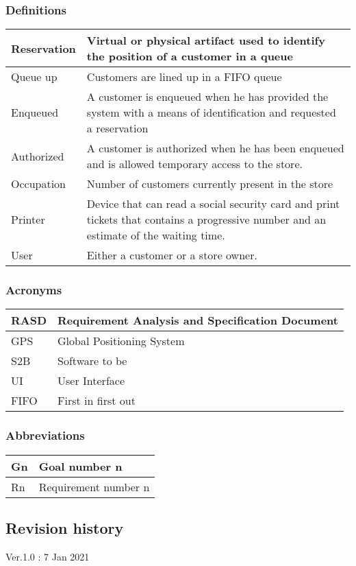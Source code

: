 \subsubsection{Definitions}
\begin{tabular}{ | m{5cm} | m{10cm} | }
	\hline
	Reservation & Virtual or physical artifact used to identify the position of a customer in a queue \\
	\hline
	Queue up & Customers are lined up in a FIFO queue\\
	\hline
	Enqueued & A customer is enqueued when he has provided the system with a means of identification and requested a reservation\\
	\hline
	Authorized & A customer is authorized when he has been enqueued and is allowed temporary access to the store.\\
	\hline
	Occupation & Number of customers currently present in the store\\
	\hline
	Printer & Device that can read a social security card and print tickets that contains a progressive number and an estimate of the waiting time.\\
	\hline
	User & Either a customer or a store owner.\\
	\hline
\end{tabular}
\subsubsection{Acronyms}
\begin{tabular}{ | m{5cm} | m{10cm} | }
	\hline
	RASD & Requirement Analysis and Specification Document \\
	\hline
	GPS & Global Positioning System \\
	\hline
	S2B & Software to be \\
	\hline
	UI & User Interface\\
	\hline
	FIFO & First in first out\\
	\hline
\end{tabular}
\subsubsection{Abbreviations}
\begin{tabular}{ | m{5cm} | m{10cm} | }
	\hline
	Gn & Goal number n \\
	\hline
	Rn & Requirement number n \\
	\hline
\end{tabular}
\subsection{Revision history}
Ver.1.0 : 7 Jan 2021
